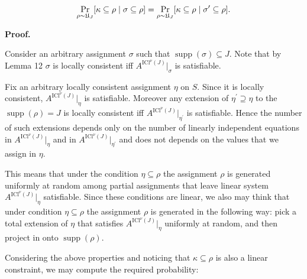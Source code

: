 \[\begin{gathered}
\Pr\limits_{\rho\sim\mathfrak{U}_{J}}[\kappa\subseteq\rho\mid\sigma\subseteq%
\rho]=\Pr\limits_{\rho\sim\mathfrak{U}_{J}}[\kappa\subseteq\rho\mid\sigma^{%
\prime}\subseteq\rho].
\end{gathered}\]






\par\medskip\noindent\textbf{Proof.}\par




Consider an arbitrary assignment $\sigma$ such that $\operatorname*{supp}(\sigma)\subseteq J$. Note that by Lemma
12 $\sigma$ is locally consistent iff $A^{\mathrm{ICl}^{\nu}\left(J\right)}|_{\sigma}$ is
satisfiable.\par




Fix an arbitrary locally consistent assignment $\eta$ on $S$. Since it is locally consistent,
$A^{\mathrm{ICl}^{\nu}\left(J\right)}|_{\eta}$ is satisfiable. Moreover any extension of $\eta^{\prime}\supseteq\eta$ to the
$\operatorname*{supp}(\rho)=J$ is locally consistent iff $A^{\mathrm{ICl}^{\nu}\left(J\right)}|_{\eta^{\prime}}$ is satisfiable. Hence the
number of such extensions depends only on the number of linearly independent equations in
$A^{\mathrm{ICl}^{\nu}\left(J\right)}|_{\eta}$ and in $A^{\mathrm{ICl}^{\nu}\left(J\right)}|_{\eta^{\prime}}$ and does not depends on the values
that we assign in $\eta$.\par




This means that under the condition $\eta\subseteq\rho$ the assignment $\rho$ is
generated uniformly at random among partial assignments that leave linear system
$A^{\mathrm{ICl}^{\nu}\left(J\right)}|_{\eta}$ satisfiable. Since these conditions are linear, we also may think that
under condition $\eta\subseteq\rho$ the assignment $\rho$ is generated in the following way: pick a
total extension of $\eta$ that satisfies $A^{\mathrm{ICl}^{\nu}\left(J\right)}|_{\eta}$ uniformly at random, and then
project in onto $\operatorname*{supp}(\rho)$.\par




Considering the above properties and noticing that $\kappa\subseteq\rho$ is also a linear
constraint, we may compute the required probability:\par


